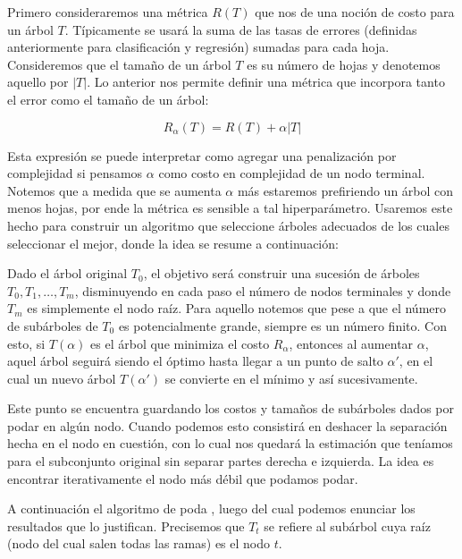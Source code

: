 Primero consideraremos una métrica $R(T)$ que nos de una noción de costo para un árbol $T$. Típicamente se usará la suma de las tasas de errores (definidas anteriormente para clasificación y regresión) sumadas para cada hoja. Consideremos que el tamaño de un árbol $T$ es su número de hojas y denotemos aquello por $|T|$. Lo anterior nos permite definir una métrica que incorpora tanto el error como el tamaño de un árbol:

\begin{equation}
    R_\alpha (T) = R(T) + \alpha |T|
\end{equation}

Esta expresión se puede interpretar como agregar una penalización por complejidad si pensamos $\alpha$ como costo en complejidad de un nodo terminal. Notemos que a medida que se aumenta $\alpha$ más estaremos prefiriendo un árbol con menos hojas, por ende la métrica es sensible a tal hiperparámetro. Usaremos este hecho para construir un algoritmo que seleccione árboles adecuados de los cuales seleccionar el mejor, donde la idea se resume a continuación:

Dado el árbol original $T_0$, el objetivo será construir una sucesión de árboles $T_0, T_1, \dots, T_m$, disminuyendo en cada paso el número de nodos terminales y donde $T_m$ es simplemente el nodo raíz. Para aquello notemos que pese a que el número de subárboles de $T_0$ es potencialmente grande, siempre es un número finito. Con esto, si $T(\alpha)$ es el árbol que minimiza el costo $R_\alpha$, entonces al aumentar $\alpha$, aquel árbol seguirá siendo el óptimo hasta llegar a un punto de salto $\alpha'$, en el cual un nuevo árbol $T(\alpha')$ se convierte en el mínimo y así sucesivamente.

Este punto se encuentra guardando los costos y tamaños de subárboles dados por podar en algún nodo. Cuando podemos esto consistirá en deshacer la separación hecha en el nodo en cuestión, con lo cual nos quedará la estimación que teníamos para el subconjunto original sin separar partes derecha e izquierda. La idea es encontrar iterativamente el nodo más débil que podamos podar.

A continuación el algoritmo de poda \cite{ripley}, luego del cual podemos enunciar los resultados que lo justifican. Precisemos que $T_t$ se refiere al subárbol cuya raíz (nodo del cual salen todas las ramas) es el nodo $t$.

